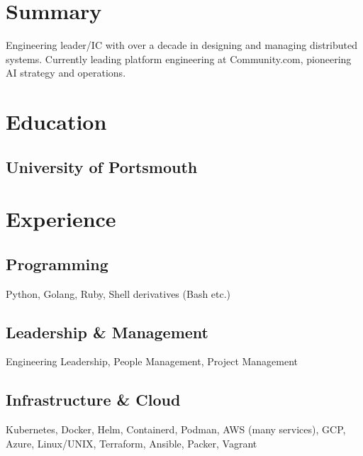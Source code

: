 \documentclass[]{resume}
\begin{document}
\hfill
\begin{minipage}[t]{0.33\textwidth}


\section{Summary}
Engineering leader/IC with over a decade in designing and managing distributed systems. Currently leading platform engineering at Community.com, pioneering AI strategy and operations. 
\sectionsep


\section{Education}

\subsection{University of Portsmouth}
\sectionsep


\section{Experience}
\subsection{Programming}
Python, Golang, Ruby, Shell derivatives (Bash etc.)
\sectionsep

\subsection{Leadership \& Management}
Engineering Leadership, People Management, Project Management

\subsection{Infrastructure \& Cloud}
Kubernetes, Docker, Helm, Containerd, Podman, AWS (many services), GCP, Azure, Linux/UNIX, Terraform, Ansible, Packer, Vagrant
\sectionsep


\end{minipage}
\end{document}

